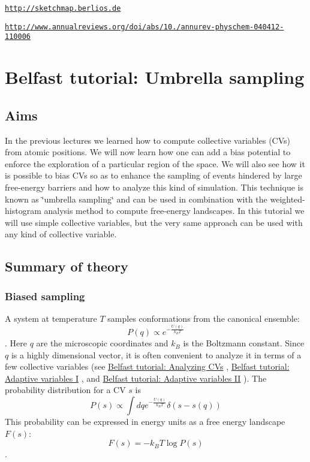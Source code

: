 \begin{DoxyItemize}
\item \href{http://sketchmap.berlios.de}{\tt http\+://sketchmap.\+berlios.\+de}
\item \href{http://www.annualreviews.org/doi/abs/10.1146/annurev-physchem-040412-110006}{\tt http\+://www.\+annualreviews.\+org/doi/abs/10./annurev-\/physchem-\/040412-\/110006} 
\end{DoxyItemize}\hypertarget{belfast-4}{}\section{Belfast tutorial\+: Umbrella sampling}\label{belfast-4}
\hypertarget{belfast-4_belfast-4-aims}{}\subsection{Aims}\label{belfast-4_belfast-4-aims}
In the previous lectures we learned how to compute collective variables (C\+Vs) from atomic positions. We will now learn how one can add a bias potential to enforce the exploration of a particular region of the space. We will also see how it is possible to bias C\+Vs so as to enhance the sampling of events hindered by large free-\/energy barriers and how to analyze this kind of simulation. This technique is known as \char`\"{}umbrella sampling\char`\"{} and can be used in combination with the weighted-\/histogram analysis method to compute free-\/energy landscapes. In this tutorial we will use simple collective variables, but the very same approach can be used with any kind of collective variable.\hypertarget{belfast-4_belfast-4-theory}{}\subsection{Summary of theory}\label{belfast-4_belfast-4-theory}
\hypertarget{belfast-4_belfast-4-theory-biased-sampling}{}\subsubsection{Biased sampling}\label{belfast-4_belfast-4-theory-biased-sampling}
A system at temperature $ T$ samples conformations from the canonical ensemble\+: \[ P(q)\propto e^{-\frac{U(q)}{k_BT}} \]. Here $ q $ are the microscopic coordinates and $ k_B $ is the Boltzmann constant. Since $ q $ is a highly dimensional vector, it is often convenient to analyze it in terms of a few collective variables (see \hyperlink{belfast-1}{Belfast tutorial\+: Analyzing C\+Vs} , \hyperlink{belfast-2}{Belfast tutorial\+: Adaptive variables I} , and \hyperlink{belfast-3}{Belfast tutorial\+: Adaptive variables I\+I} ). The probability distribution for a C\+V $ s$ is \[ P(s)\propto \int dq e^{-\frac{U(q)}{k_BT}} \delta(s-s(q)) \] This probability can be expressed in energy units as a free energy landscape $ F(s) $\+: \[ F(s)=-k_B T \log P(s) \].

